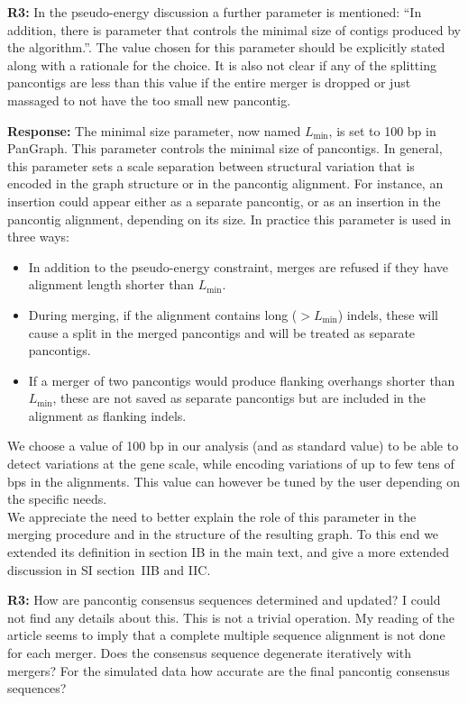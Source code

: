 \documentclass[aps,rmp,onecolumn]{revtex4-1}
\newcommand{\Lthr}{L_{\min}}
\newcommand{\reviewer}[2]{\textbf{#1:} #2\vskip 5mm}
\newcommand{\response}[1]{{\it {\color{response}\textbf{Response:} #1}}\vskip 5mm}
\newcommand{\SIalgo}{II}
\begin{document}
\reviewer{R3}{In the pseudo-energy discussion a further parameter is mentioned: ``In addition, there is parameter that controls the minimal size of contigs produced by the algorithm.''. The value chosen for this parameter should be explicitly stated along with a rationale for the choice. It is also not clear if any of the splitting pancontigs are less than this value if the entire merger is dropped or just massaged to not have the too small new pancontig.}
\response{The minimal size parameter, now named $\Lthr$, is set to 100 bp in PanGraph. This parameter controls the minimal size of pancontigs. In general, this parameter sets a scale separation between structural variation that is encoded in the graph structure or in the pancontig alignment. 
For instance, an insertion could appear either as a separate pancontig, or as an insertion in the pancontig alignment, depending on its size. 
In practice this parameter is used in three ways:
      \begin{itemize}
            \item In addition to the pseudo-energy constraint, merges are refused if they have alignment length shorter than $\Lthr$.
            \item During merging, if the alignment contains long ($> \Lthr$) indels, these will cause a split in the merged pancontigs and will be treated as separate pancontigs.
            \item If a merger of two pancontigs would produce flanking overhangs shorter than $\Lthr$, these are not saved as separate pancontigs but are included in the alignment as flanking indels.
      \end{itemize}
      We choose a value of 100 bp in our analysis (and as standard value) to be able to detect variations at the gene scale, while encoding variations of up to few tens of bps in the alignments. This value can however be tuned by the user depending on the specific needs.\\
      We appreciate the need to better explain the role of this parameter in the merging procedure and in the structure of the resulting graph. To this end we extended its definition in section IB in the main text, and give a more extended discussion in SI section~\SIalgo B and \SIalgo C.\\
}

\reviewer{R3}{How are pancontig consensus sequences determined and updated? I could not find any details about this. This is not a trivial operation. My reading of the article seems to imply that a complete multiple sequence alignment is not done for each merger. Does the consensus sequence degenerate iteratively with mergers? For the simulated data how accurate are the final pancontig consensus sequences?}
\end{document}
